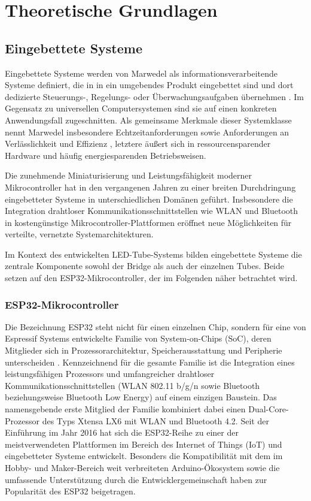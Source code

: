 \chapter{Theoretische Grundlagen}
\label{chap:grundlagen}

\section{Eingebettete Systeme}
\label{sec:eingebettete-systeme}

Eingebettete Systeme werden von Marwedel als informationsverarbeitende Systeme 
definiert, die in in ein umgebendes Produkt eingebettet sind und dort dedizierte 
Steuerungs-, Regelungs- oder Überwachungsaufgaben übernehmen \cite{marwedel2021}. 
Im Gegensatz zu universellen Computersystemen sind sie auf einen konkreten 
Anwendungsfall zugeschnitten. Als gemeinsame Merkmale dieser Systemklasse nennt 
Marwedel insbesondere Echtzeitanforderungen sowie Anforderungen an Verlässlichkeit 
und Effizienz \cite{marwedel2021}, letztere äußert sich in ressourcensparender 
Hardware und häufig energiesparenden Betriebsweisen.

Die zunehmende Miniaturisierung und Leistungsfähigkeit moderner Mikrocontroller hat in 
den vergangenen Jahren zu einer breiten Durchdringung eingebetteter Systeme in 
unterschiedlichen Domänen geführt. Insbesondere die 
Integration drahtloser Kommunikationsschnittstellen wie WLAN und Bluetooth in 
kostengünstige Mikrocontroller-Plattformen eröffnet neue Möglichkeiten für verteilte, 
vernetzte Systemarchitekturen.

Im Kontext des entwickelten LED-Tube-Systems bilden eingebettete Systeme die zentrale 
Komponente sowohl der Bridge als auch der einzelnen Tubes. Beide setzen auf den 
ESP32-Mikrocontroller, der im Folgenden näher betrachtet wird.

\subsection{ESP32-Mikrocontroller}
\label{subsec:esp32}

Die Bezeichnung ESP32 steht nicht für einen einzelnen Chip, sondern für eine von 
Espressif Systems entwickelte Familie von System-on-Chips (SoC), deren Mitglieder sich 
in Prozessorarchitektur, Speicherausstattung und Peripherie unterscheiden 
\cite{espressif_esp32}. Kennzeichnend für die gesamte Familie ist die Integration eines 
leistungsfähigen Prozessors und umfangreicher drahtloser Kommunikationsschnittstellen 
(WLAN 802.11 b/g/n sowie Bluetooth beziehungsweise Bluetooth Low Energy) auf einem 
einzigen Baustein. Das namensgebende erste Mitglied der Familie kombiniert dabei einen 
Dual-Core-Prozessor des Typs Xtensa LX6 mit WLAN und Bluetooth 4.2. Seit der Einführung 
im Jahr 2016 hat sich die ESP32-Reihe zu einer der meistverwendeten Plattformen im 
Bereich des Internet of Things (IoT) und eingebetteter Systeme entwickelt. Besonders die 
Kompatibilität mit dem im Hobby- und Maker-Bereich weit verbreiteten Arduino-Ökosystem 
sowie die umfassende Unterstützung durch die Entwicklergemeinschaft haben zur 
Popularität des ESP32 beigetragen.

